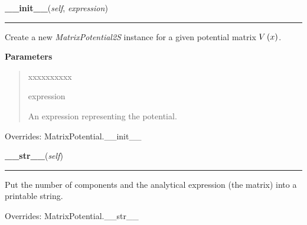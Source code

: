 \hspace{.8\funcindent}\begin{boxedminipage}{\funcwidth}

    \raggedright \textbf{\_\_init\_\_}(\textit{self}, \textit{expression})

    \vspace{-1.5ex}

    \rule{\textwidth}{0.5\fboxrule}
\setlength{\parskip}{2ex}
    Create a new \textit{MatrixPotential2S} instance for a given potential
    matrix $V\left( x \right)$.

\setlength{\parskip}{1ex}
      \textbf{Parameters}
      \vspace{-1ex}

      \begin{quote}
        \begin{Ventry}{xxxxxxxxxx}

          \item[expression]

          An expression representing the potential.

        \end{Ventry}

      \end{quote}



      Overrides: MatrixPotential.\_\_init\_\_

    \end{boxedminipage}

    \vspace{0.5ex}

\hspace{.8\funcindent}\begin{boxedminipage}{\funcwidth}

    \raggedright \textbf{\_\_str\_\_}(\textit{self})

    \vspace{-1.5ex}

    \rule{\textwidth}{0.5\fboxrule}
\setlength{\parskip}{2ex}
    Put the number of components and the analytical expression (the matrix)
    into a printable string.

\setlength{\parskip}{1ex}


      Overrides: MatrixPotential.\_\_str\_\_

    \end{boxedminipage}

    \vspace{0.5ex}

